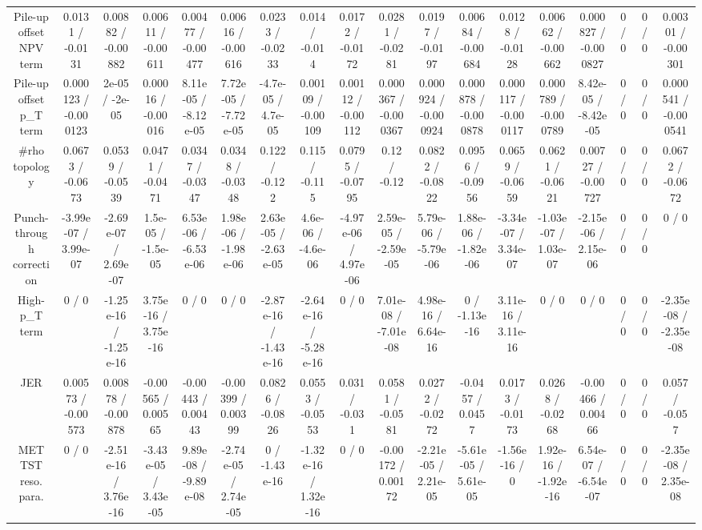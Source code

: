 \documentclass[10pt]{article}
\begin{document}
\begin{table}[htbp]
\begin{center}
\begin{tabular}{|c|c|c|c|c|c|c|c|c|c|c|c|c|c|c|c|c|c|}
  Pile-up offset NPV term & 0.0131 / -0.0131 & 0.00882 / -0.00882 & 0.00611 / -0.00611 & 0.00477 / -0.00477 & 0.00616 / -0.00616 & 0.0233 / -0.0233 & 0.014 / -0.014 & 0.0172 / -0.0172 & 0.0281 / -0.0281 & 0.0197 / -0.0197 & 0.00684 / -0.00684 & 0.0128 / -0.0128 & 0.00662 / -0.00662 & 0.000827 / -0.000827 & 0 / 0 & 0 / 0 & 0.00301 / -0.00301 \\ 
  Pile-up offset p_{T} term & 0.000123 / -0.000123 & 2e-05 / -2e-05 & 0.00016 / -0.00016 & 8.11e-05 / -8.12e-05 & 7.72e-05 / -7.72e-05 & -4.7e-05 / 4.7e-05 & 0.00109 / -0.00109 & 0.00112 / -0.00112 & 0.000367 / -0.000367 & 0.000924 / -0.000924 & 0.000878 / -0.000878 & 0.000117 / -0.000117 & 0.000789 / -0.000789 & 8.42e-05 / -8.42e-05 & 0 / 0 & 0 / 0 & 0.000541 / -0.000541 \\ 
  #rho topology & 0.0673 / -0.0673 & 0.0539 / -0.0539 & 0.0471 / -0.0471 & 0.0347 / -0.0347 & 0.0348 / -0.0348 & 0.122 / -0.122 & 0.115 / -0.115 & 0.0795 / -0.0795 & 0.12 / -0.12 & 0.0822 / -0.0822 & 0.0956 / -0.0956 & 0.0659 / -0.0659 & 0.0621 / -0.0621 & 0.00727 / -0.00727 & 0 / 0 & 0 / 0 & 0.0672 / -0.0672 \\ 
  Punch-through correction & -3.99e-07 / 3.99e-07 & -2.69e-07 / 2.69e-07 & 1.5e-05 / -1.5e-05 & 6.53e-06 / -6.53e-06 & 1.98e-06 / -1.98e-06 & 2.63e-05 / -2.63e-05 & 4.6e-06 / -4.6e-06 & -4.97e-06 / 4.97e-06 & 2.59e-05 / -2.59e-05 & 5.79e-06 / -5.79e-06 & 1.88e-06 / -1.82e-06 & -3.34e-07 / 3.34e-07 & -1.03e-07 / 1.03e-07 & -2.15e-06 / 2.15e-06 & 0 / 0 & 0 / 0 & 0 / 0 \\ 
  High-p_{T} term & 0 / 0 & -1.25e-16 / -1.25e-16 & 3.75e-16 / 3.75e-16 & 0 / 0 & 0 / 0 & -2.87e-16 / -1.43e-16 & -2.64e-16 / -5.28e-16 & 0 / 0 & 7.01e-08 / -7.01e-08 & 4.98e-16 / 6.64e-16 & 0 / -1.13e-16 & 3.11e-16 / 3.11e-16 & 0 / 0 & 0 / 0 & 0 / 0 & 0 / 0 & -2.35e-08 / -2.35e-08 \\ 
  JER & 0.00573 / -0.00573 & 0.00878 / -0.00878 & -0.00565 / 0.00565 & -0.00443 / 0.00443 & -0.00399 / 0.00399 & 0.0826 / -0.0826 & 0.0553 / -0.0553 & 0.031 / -0.031 & 0.0581 / -0.0581 & 0.0272 / -0.0272 & -0.0457 / 0.0457 & 0.0173 / -0.0173 & 0.0268 / -0.0268 & -0.00466 / 0.00466 & 0 / 0 & 0 / 0 & 0.057 / -0.057 \\ 
  MET TST reso. para. & 0 / 0 & -2.51e-16 / 3.76e-16 & -3.43e-05 / 3.43e-05 & 9.89e-08 / -9.89e-08 & -2.74e-05 / 2.74e-05 & 0 / -1.43e-16 & -1.32e-16 / 1.32e-16 & 0 / 0 & -0.00172 / 0.00172 & -2.21e-05 / 2.21e-05 & -5.61e-05 / 5.61e-05 & -1.56e-16 / 0 & 1.92e-16 / -1.92e-16 & 6.54e-07 / -6.54e-07 & 0 / 0 & 0 / 0 & -2.35e-08 / 2.35e-08 \\ 

\end{tabular}
\end{center}
\end{table}
\end{document}
